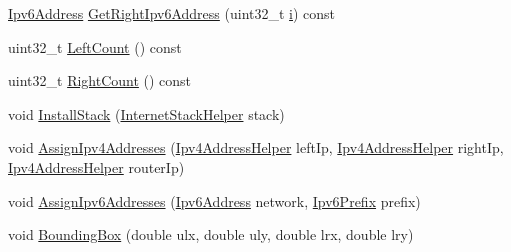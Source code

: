 \begin{DoxyCompactItemize}
\item 
\hyperlink{classns3_1_1Ipv6Address}{Ipv6\+Address} \hyperlink{classns3_1_1PointToPointDumbbellHelper_a4310bba07c7bca3d1a771e29baae7672}{Get\+Right\+Ipv6\+Address} (uint32\+\_\+t \hyperlink{lte__uplink__power__control_8m_a6f6ccfcf58b31cb6412107d9d5281426}{i}) const 
\item 
uint32\+\_\+t \hyperlink{classns3_1_1PointToPointDumbbellHelper_a6a1fd00ea7d546fc3b45054eb3144a51}{Left\+Count} () const 
\item 
uint32\+\_\+t \hyperlink{classns3_1_1PointToPointDumbbellHelper_ae70148ba832410e8a7a030a323102d97}{Right\+Count} () const 
\item 
void \hyperlink{classns3_1_1PointToPointDumbbellHelper_a97ba503dc85cb2ac311c3aaa7a0d5235}{Install\+Stack} (\hyperlink{classns3_1_1InternetStackHelper}{Internet\+Stack\+Helper} stack)
\item 
void \hyperlink{classns3_1_1PointToPointDumbbellHelper_a3a2e0460a83df9b826b4a4553db22984}{Assign\+Ipv4\+Addresses} (\hyperlink{classns3_1_1Ipv4AddressHelper}{Ipv4\+Address\+Helper} left\+Ip, \hyperlink{classns3_1_1Ipv4AddressHelper}{Ipv4\+Address\+Helper} right\+Ip, \hyperlink{classns3_1_1Ipv4AddressHelper}{Ipv4\+Address\+Helper} router\+Ip)
\item 
void \hyperlink{classns3_1_1PointToPointDumbbellHelper_ad8dfcb5147e9b4eddc9460780f96628c}{Assign\+Ipv6\+Addresses} (\hyperlink{classns3_1_1Ipv6Address}{Ipv6\+Address} network, \hyperlink{classns3_1_1Ipv6Prefix}{Ipv6\+Prefix} prefix)
\item 
void \hyperlink{classns3_1_1PointToPointDumbbellHelper_ac1efd7a81e9f99e1e6af211039408af3}{Bounding\+Box} (double ulx, double uly, double lrx, double lry)
\end{DoxyCompactItemize}
